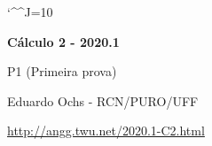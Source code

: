 \documentclass[oneside,12pt]{article}
\begin{document}
\catcode`\^^J=10


\long{}
\long{}
\long{}
\long{}
\long{}
\long{}
\long{}
\long{}
\long{}
\long{}

\long{}
\long{}

\def\frown{\ensuremath{{=}{(}}}
\def\True {\mathbf{V}}
\def\False{\mathbf{F}}
\def\D    {\displaystyle}
\def\S{\sen x}
\def\C{\cos x}

\def\drafturl{http://angg.twu.net/LATEX/2020-1-C2.pdf}
\def\drafturl{http://angg.twu.net/2020.1-C2.html}
\def\draftfooter{\tiny \href{\drafturl}{\jobname{}} \ColorBrown{\shorttoday{} \hours}}



%

\thispagestyle{empty}

\begin{center}

\vspace*{1.2cm}

{\bf \Large Cálculo 2 - 2020.1}

\bsk

P1 (Primeira prova)

\bsk

Eduardo Ochs - RCN/PURO/UFF

\url{http://angg.twu.net/2020.1-C2.html}

\end{center}
\end{document}
